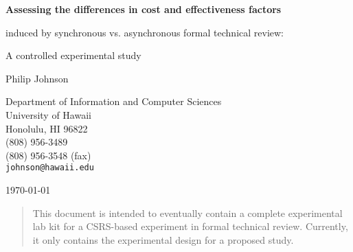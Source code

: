 

\begin{titlepage}
\vspace*{1in}
\begin{center}
   
\Large {\bf
Assessing the differences in cost and effectiveness factors 
 
induced by synchronous vs. asynchronous formal technical review:

A controlled experimental study
}

\vspace*{1in}

\normalsize \rm

  

Philip Johnson                       \medskip\par
Department of Information and Computer Sciences\\ 
University of Hawaii\\ 
Honolulu, HI 96822\\                       
(808) 956-3489\\
(808) 956-3548 (fax)\\
{\tt johnson@hawaii.edu}                 \bigskip\par

\today                                   \bigskip\par

\end{center}

\begin{abstract}

  This document is intended to eventually contain a complete experimental
  lab kit for a CSRS-based experiment in formal technical
  review. Currently, it only contains the experimental design for a
  proposed study.

\end{abstract}

\end{titlepage}



